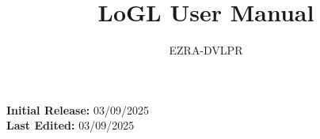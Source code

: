 \documentclass[letterpaper,12pt]{article}
\begin{document}
\title{LoGL User Manual}

\author{EZRA-DVLPR}

\date{} %

\maketitle

\begin{center}
	\textbf{Initial Release:} 03/09/2025\\
	\textbf{Last Edited:} 03/09/2025\\
\end{center}

\tableofcontents

\newpage




\end{document}
